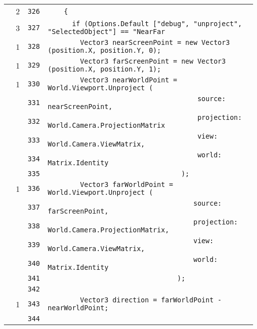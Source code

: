 \documentclass[a4paper,10pt]{article}
\begin{document}
\begin{longtable}[l]{lrrl}
\cellcolor{green} & 2 & \verb~326~ & \verb~    {~\\
\cellcolor{green} & 3 & \verb~327~ & \verb~      if (Options.Default ["debug", "unproject", "SelectedObject"] == "NearFar~\\
\cellcolor{green} & 1 & \verb~328~ & \verb~        Vector3 nearScreenPoint = new Vector3 (position.X, position.Y, 0);~\\
\cellcolor{green} & 1 & \verb~329~ & \verb~        Vector3 farScreenPoint = new Vector3 (position.X, position.Y, 1);~\\
\cellcolor{green} & 1 & \verb~330~ & \verb~        Vector3 nearWorldPoint = World.Viewport.Unproject (~\\
\cellcolor{gray} &  & \verb~331~ & \verb~                                     source: nearScreenPoint,~\\
\cellcolor{gray} &  & \verb~332~ & \verb~                                     projection: World.Camera.ProjectionMatrix~\\
\cellcolor{gray} &  & \verb~333~ & \verb~                                     view: World.Camera.ViewMatrix,~\\
\cellcolor{gray} &  & \verb~334~ & \verb~                                     world: Matrix.Identity~\\
\cellcolor{gray} &  & \verb~335~ & \verb~                                 );~\\
\cellcolor{green} & 1 & \verb~336~ & \verb~        Vector3 farWorldPoint = World.Viewport.Unproject (~\\
\cellcolor{gray} &  & \verb~337~ & \verb~                                    source: farScreenPoint,~\\
\cellcolor{gray} &  & \verb~338~ & \verb~                                    projection: World.Camera.ProjectionMatrix,~\\
\cellcolor{gray} &  & \verb~339~ & \verb~                                    view: World.Camera.ViewMatrix,~\\
\cellcolor{gray} &  & \verb~340~ & \verb~                                    world: Matrix.Identity~\\
\cellcolor{gray} &  & \verb~341~ & \verb~                                );~\\
\cellcolor{gray} &  & \verb~342~ & \verb~~\\
\cellcolor{green} & 1 & \verb~343~ & \verb~        Vector3 direction = farWorldPoint - nearWorldPoint;~\\
\cellcolor{gray} &  & \verb~344~ & \verb~~\\

\end{longtable}
\end{document}
